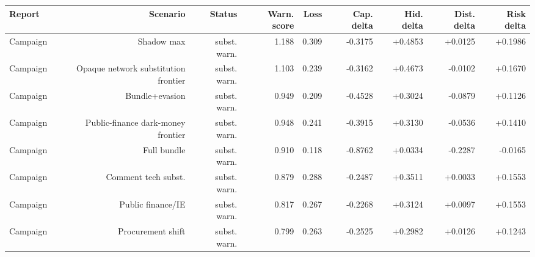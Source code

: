 \begingroup
\begin{center}
\begin{minipage}{\textwidth}
\centering
\scriptsize
\setlength{\tabcolsep}{1.5pt}
\begin{tabular*}{\textwidth}{@{\extracolsep{\fill}}lrrrrrrrr@{}}
\toprule
Report & Scenario & Status & Warn. score & Loss & Cap. delta & Hid. delta & Dist. delta & Risk delta \\
\midrule
Campaign & Shadow max & subst. warn. & 1.188 & 0.309 & -0.3175 & +0.4853 & +0.0125 & +0.1986 \\
Campaign & Opaque network substitution frontier & subst. warn. & 1.103 & 0.239 & -0.3162 & +0.4673 & -0.0102 & +0.1670 \\
Campaign & Bundle+evasion & subst. warn. & 0.949 & 0.209 & -0.4528 & +0.3024 & -0.0879 & +0.1126 \\
Campaign & Public-finance dark-money frontier & subst. warn. & 0.948 & 0.241 & -0.3915 & +0.3130 & -0.0536 & +0.1410 \\
Campaign & Full bundle & subst. warn. & 0.910 & 0.118 & -0.8762 & +0.0334 & -0.2287 & -0.0165 \\
Campaign & Comment tech subst. & subst. warn. & 0.879 & 0.288 & -0.2487 & +0.3511 & +0.0033 & +0.1553 \\
Campaign & Public finance/IE & subst. warn. & 0.817 & 0.267 & -0.2268 & +0.3124 & +0.0097 & +0.1553 \\
Campaign & Procurement shift & subst. warn. & 0.799 & 0.263 & -0.2525 & +0.2982 & +0.0126 & +0.1243 \\
\bottomrule
\end{tabular*}
\par\smallskip
\captionsetup{hypcap=false}
\label{tab:substitution-warnings}
\end{minipage}
\end{center}
\endgroup
